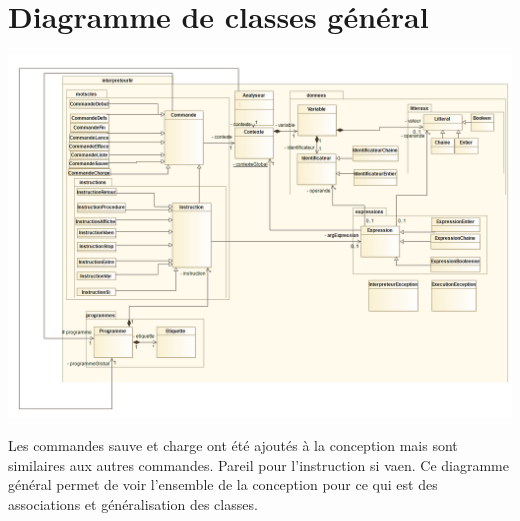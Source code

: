\section{Diagramme de classes général}
\begin{center}\includegraphics[scale=0.35]{fichiers/dossierPartieConception/img/COO/COO_prototype_3/Scéma général simplifié}\end{center}
\par Les commandes sauve et charge ont été ajoutés à la conception mais sont similaires aux autres commandes. Pareil pour l'instruction si vaen. Ce diagramme général permet de voir l'ensemble de la conception pour ce qui est des associations et généralisation des classes.